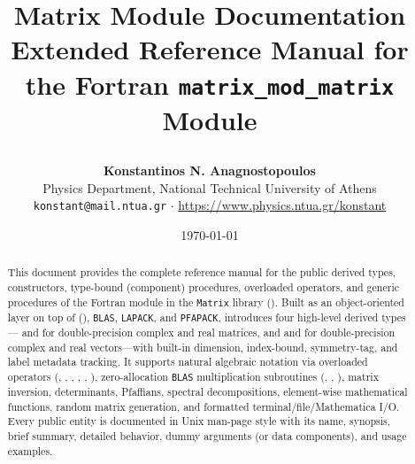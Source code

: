 \documentclass[a4paper,11pt]{article}
\title{%
  \vspace{-1.2cm}%
  \begin{tcolorbox}[
    enhanced,
    colback=modPrimary,
    colframe=modPrimary!80!black,
    coltext=white,
    arc=2mm,
    boxrule=1pt,
    top=12pt, bottom=12pt, left=12pt, right=12pt
  ]
  \centering
  {\LARGE\bfseries Matrix Module Documentation}\\[6pt]
  {\large Extended Reference Manual for the Fortran \texttt{matrix\_mod\_matrix} Module}
  \end{tcolorbox}%
  \vspace{-0.4cm}%
}
\author{\textbf{Konstantinos N. Anagnostopoulos}\\
  {\small Physics Department, National Technical University of Athens}\\
  {\small \texttt{konstant@mail.ntua.gr} $\cdot$ \url{https://www.physics.ntua.gr/konstant}}}
\date{\small \today}
\begin{document}
\maketitle

\begin{abstract}
\noindent
This document provides the complete reference manual for the public derived types, constructors, type-bound (component) procedures, overloaded operators, and generic procedures of the Fortran  module in the \texttt{Matrix} library (). Built as an object-oriented layer on top of  (), \texttt{BLAS}, \texttt{LAPACK}, and \texttt{PFAPACK},  introduces four high-level derived types--- and  for double-precision complex and real matrices, and  and  for double-precision complex and real vectors---with built-in dimension, index-bound, symmetry-tag, and label metadata tracking. It supports natural algebraic notation via overloaded operators (\procname{=}, \procname{+}, \procname{-}, \procname{*}, \procname{/}, \procname{**}), zero-allocation \texttt{BLAS} multiplication subroutines (, , ), matrix inversion, determinants, Pfaffians, spectral decompositions, element-wise mathematical functions, random matrix generation, and formatted terminal/file/Mathematica I/O. Every public entity is documented in Unix man-page style with its name, synopsis, brief summary, detailed behavior, dummy arguments (or data components), and usage examples.
\end{abstract}

\vspace{0.3cm}
\begin{tcolorbox}[
  enhanced,
  breakable,
  colback=modBoxBg!60,
  colframe=modPrimary!60,
  arc=1.5mm,
  boxrule=0.6pt,
  left=10pt, right=10pt, top=6pt, bottom=8pt
]
\tableofcontents
\end{tcolorbox}
\newpage














\end{document}
